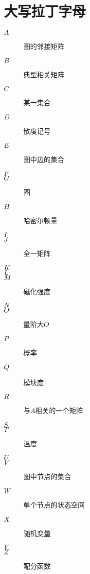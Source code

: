 \documentclass{ctexart}
\begin{document}
\section{大写拉丁字母}
\begin{description}
    \item[$A$] 图的邻接矩阵
    \item[$B$] 典型相关矩阵
    \item[$C$] 某一集合
    \item[$D$] 散度记号
    \item[$E$] 图中边的集合
    \item[$F$] 
    \item[$G$] 图
    \item[$H$] 哈密尔顿量
    \item[$I$] 
    \item[$J$] 全一矩阵
    \item[$K$] 
    \item[$L$] 
    \item[$M$] 磁化强度
    \item[$N$] 
    \item[$O$] 量阶大$O$
    \item[$P$] 概率
    \item[$Q$] 模块度
    \item[$R$] 与$A$相关的一个矩阵
    \item[$S$] 
    \item[$T$] 温度
    \item[$U$] 
    \item[$V$] 图中节点的集合
    \item[$W$] 单个节点的状态空间
    \item[$X$] 随机变量
    \item[$Y$] 
    \item[$Z$] 配分函数
\end{description}
\end{document}
